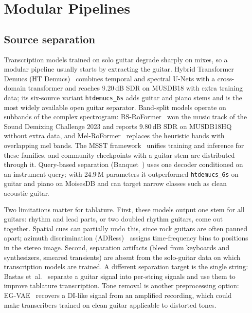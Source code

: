 \section{Modular Pipelines}
\label{sec:modular}

\subsection{Source separation}
\label{sec:separation}
Transcription models trained on solo guitar degrade sharply on mixes, so a
modular pipeline usually starts by extracting the guitar. Hybrid Transformer
Demucs (HT Demucs)~\cite{rouard2023htdemucs} combines temporal and spectral
U-Nets with a cross-domain transformer and reaches 9.20\,dB SDR on MUSDB18
with extra training data; its six-source variant \texttt{htdemucs\_6s} adds
guitar and piano stems and is the most widely available open guitar
separator. Band-split models operate on subbands of the complex spectrogram:
BS-RoFormer~\cite{lu2023bsroformer} won the music track of the Sound Demixing
Challenge 2023 and reports 9.80\,dB SDR on MUSDB18HQ without extra data, and
Mel-RoFormer~\cite{wang2023melroformer} replaces the heuristic bands with
overlapping mel bands. The MSST framework~\cite{solovyev2026msst} unifies
training and inference for these families, and community checkpoints with a
guitar stem are distributed through it. Query-based separation
(Banquet~\cite{watcharasupat2024banquet}) uses one decoder conditioned on an
instrument query; with 24.9\,M parameters it outperformed
\texttt{htdemucs\_6s} on guitar and piano on MoisesDB and can target narrow
classes such as clean acoustic guitar.

Two limitations matter for tablature. First, these models output one stem for
all guitars: rhythm and lead parts, or two doubled rhythm guitars, come out
together. Spatial cues can partially undo this, since rock guitars are often
panned apart; azimuth discrimination (ADRess)~\cite{barry2004adress} assigns
time-frequency bins to positions in the stereo image. Second, separation
artifacts (bleed from keyboards and synthesizers, smeared transients) are
absent from the solo-guitar data on which transcription models are trained.
A different separation target is the single string: Bastas
et~al.~\cite{bastas2025stringsep} separate a guitar signal into per-string
signals and use them to improve tablature transcription. Tone removal is
another preprocessing option: EG-VAE~\cite{yeh2026egvae} recovers a DI-like
signal from an amplified recording, which could make transcribers trained on
clean guitar applicable to distorted tones.

